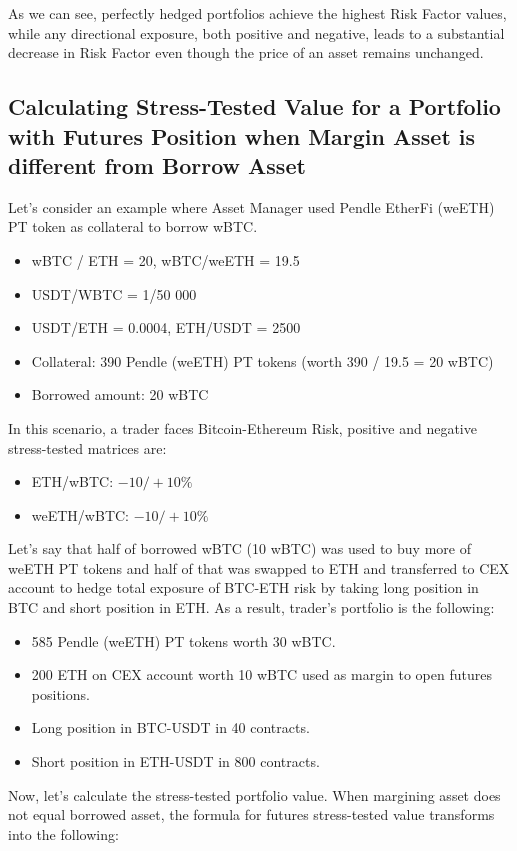 \documentclass[conference]{IEEEtran}
\begin{document}
As we can see, perfectly hedged portfolios achieve the highest Risk Factor values, while any directional exposure, both positive and negative, leads to a substantial decrease in Risk Factor even though the price of an asset remains unchanged.

\subsection{Calculating Stress-Tested Value for a Portfolio with Futures Position when Margin Asset is different from Borrow Asset
}

Let’s consider an example where Asset Manager used Pendle EtherFi (weETH) PT token as collateral to borrow wBTC. 
\begin{itemize}
	\item wBTC / ETH = 20, wBTC/weETH = 19.5
	\item USDT/WBTC = 1/50 000
	\item USDT/ETH = 0.0004, ETH/USDT = 2500
	\item Collateral: 390 Pendle (weETH) PT tokens (worth 390 / 19.5 = 20 wBTC)
	\item Borrowed amount: 20 wBTC
\end{itemize}

In this scenario, a trader faces Bitcoin-Ethereum Risk, positive and negative stress-tested matrices are:
\begin{itemize}
	\item ETH/wBTC: $-10/+10\%$
	\item weETH/wBTC: $-10/+10\%$
\end{itemize}

Let’s say that half of borrowed wBTC  (10 wBTC) was used to buy more of weETH PT tokens and half of that was swapped to ETH and transferred to CEX account to hedge total exposure of BTC-ETH risk by taking long position in BTC and short position in ETH. 
As a result, trader’s portfolio is the following:

\begin{itemize}
	\item 585 Pendle (weETH) PT tokens worth 30 wBTC. 
	\item 200 ETH on CEX account worth 10 wBTC used as margin to open futures positions.
	\item Long position in BTC-USDT in 40 contracts. 
	\item Short position in ETH-USDT in 800 contracts. 
\end{itemize}

Now, let’s calculate the stress-tested portfolio value. When margining asset does not equal borrowed asset, the formula for futures stress-tested value transforms into the following:
\end{document}
